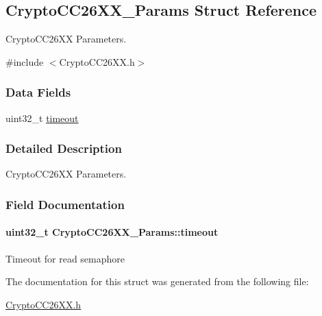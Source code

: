 \subsection{Crypto\-C\-C26\-X\-X\-\_\-\-Params Struct Reference}
\label{struct_crypto_c_c26_x_x___params}


Crypto\-C\-C26\-X\-X Parameters.  




{\ttfamily \#include $<$Crypto\-C\-C26\-X\-X.\-h$>$}

\subsubsection*{Data Fields}
\begin{DoxyCompactItemize}
\item 
uint32\-\_\-t \hyperlink{struct_crypto_c_c26_x_x___params_a0a0722be7543d9ff4de0c1107357758c}{timeout}
\end{DoxyCompactItemize}


\subsubsection{Detailed Description}
Crypto\-C\-C26\-X\-X Parameters. 

\subsubsection{Field Documentation}
\paragraph[{timeout}]{\setlength{\rightskip}{0pt plus 5cm}uint32\-\_\-t Crypto\-C\-C26\-X\-X\-\_\-\-Params\-::timeout}\label{struct_crypto_c_c26_x_x___params_a0a0722be7543d9ff4de0c1107357758c}
Timeout for read semaphore 

The documentation for this struct was generated from the following file\-:\begin{DoxyCompactItemize}
\item 
\hyperlink{_crypto_c_c26_x_x_8h}{Crypto\-C\-C26\-X\-X.\-h}\end{DoxyCompactItemize}

